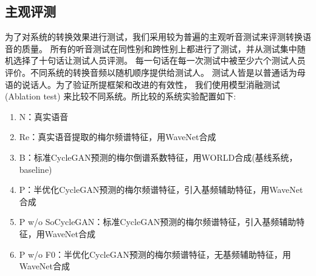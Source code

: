 \begin{table}

    \label{tab:mse}
\end{table}  

\subsection{主观评测}
为了对系统的转换效果进行测试，我们采用较为普遍的主观听音测试来评测转换语音的质量。
所有的听音测试在同性别和跨性别上都进行了测试，并从测试集中随机选择了十句话让测试人员评测。
每一句话在每一次测试中被至少六个测试人员评价。不同系统的转换音频以随机顺序提供给测试人。
测试人皆是以普通话为母语的说话人。为了验证所提框架和改进的有效性，
我们使用模型消融测试 (Ablation test) 来比较不同系统。所比较的系统实验配置如下:

\begin{enumerate}
    \item N：真实语音
    \item Re：真实语音提取的梅尔频谱特征，用WaveNet合成
    \item B：标准CycleGAN预测的梅尔倒谱系数特征，用WORLD合成(基线系统，baseline)
    \item P：半优化CycleGAN预测的梅尔频谱特征，引入基频辅助特征，用WaveNet合成
    \item P w/o SoCycleGAN：标准CycleGAN预测的梅尔频谱特征，引入基频辅助特征，用WaveNet合成
    \item P w/o F0：半优化CycleGAN预测的梅尔频谱特征，无基频辅助特征，用WaveNet合成
\end{enumerate}

